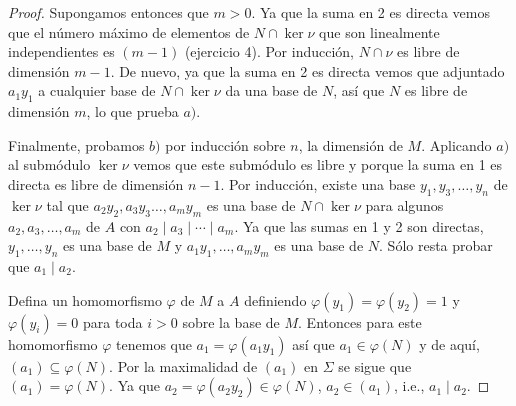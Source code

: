 \begin{proof}
  Supongamos entonces que $m>0$. Ya que la suma en 2 es directa vemos que el número máximo de elementos de $N \cap \ker \nu$ que son linealmente independientes es $(m-1)$ (ejercicio 4). Por inducción, $N \cap \nu$ es libre de dimensión $m-1$. De nuevo, ya que la suma en 2 es directa vemos que adjuntado $a_1 y_1$ a cualquier base de $N \cap \ker \nu$  da una base de $N$, así que $N$ es libre de dimensión $m$, lo que prueba $a)$.

  Finalmente, probamos $b)$ por inducción sobre $n$, la dimensión de $M$. Aplicando $a)$ al submódulo $\ker\nu$ vemos que este submódulo es libre y porque la suma en 1 es directa es libre de dimensión $n-1$. Por inducción, existe una base $y_1, y_3,\ldots,y_n$ de $\ker \nu$ tal que $a_2y_2,a_3y_3\ldots,a_my_m$ es una base de $N \cap \ker \nu$ para algunos $a_2,a_3,\ldots,a_m$ de $A$ con $a_2 \mid a_3 \mid \cdots \mid a_m$. Ya que las sumas en 1 y 2 son directas, $y_1,\ldots,y_n$ es una base de $M$ y $a_1y_1,\ldots,a_my_m$ es una base de $N$. Sólo resta probar que $a_1 \mid a_2$.

  Defina un homomorfismo $\varphi$ de $M$ a $A$ definiendo $\varphi(y_1) = \varphi(y_2) = 1$ y $\varphi(y_i) = 0$ para toda $i>0$ sobre la base de $M$. Entonces para este homomorfismo $\varphi$ tenemos que $a_1 = \varphi(a_1y_1)$ así que $a_1 \in \varphi(N)$ y de aquí, $(a_1) \subseteq \varphi(N)$. Por la maximalidad de $(a_1)$ en $\Sigma$ se sigue que $(a_1) = \varphi(N)$. Ya que $a_2 = \varphi(a_2y_2) \in \varphi(N)$, $a_2 \in (a_1)$, i.e., $a_1 \mid a_2$.
\end{proof}



\ExerciseSection

